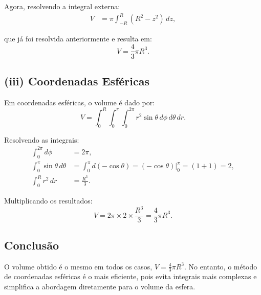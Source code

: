 \documentclass[a4paper,12pt]{article}
\begin{document}
\begin{flushleft}
Agora, resolvendo a integral externa:
\begin{align*}
V &= \pi \int_{-R}^{R} (R^2 - z^2) \, dz,
\end{align*}

que já foi resolvida anteriormente e resulta em:
\begin{equation}
V = \frac{4}{3} \pi R^3.
\end{equation}

\subsection*{(iii) Coordenadas Esféricas}
Em coordenadas esféricas, o volume é dado por:
\begin{equation}
V = \int_0^R \int_0^{\pi} \int_0^{2\pi} r^2 \sin \theta \, d\phi \, d\theta \, dr.
\end{equation}

Resolvendo as integrais:
\begin{align*}
\int_0^{2\pi} d\phi &= 2\pi, \\
\int_0^{\pi} \sin\theta \, d\theta &= \int_0^{\pi} d(-\cos\theta) = (-\cos\theta) \Big|_0^{\pi} = (1 + 1) = 2, \\
\int_0^R r^2 \, dr &= \frac{R^3}{3}.
\end{align*}

Multiplicando os resultados:
\begin{equation}
V = 2\pi \times 2 \times \frac{R^3}{3} = \frac{4}{3} \pi R^3.
\end{equation}

\subsection*{Conclusão}
O volume obtido é o mesmo em todos os casos, $V = \frac{4}{3} \pi R^3$. No entanto, o método de coordenadas esféricas 
é o mais eficiente, pois evita integrais mais complexas e simplifica a abordagem diretamente para o volume da esfera.
\end{flushleft}
\end{document}
